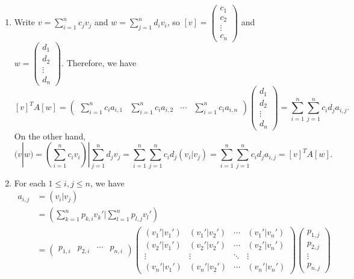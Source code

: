 \documentclass[a4paper, 12pt]{article}
\begin{document}
\begin{enumerate}[(1)]
\item Write \(v=\sum_{i=1}^{n}c_jv_j\) and \(w=\sum_{j=1}^{n}d_iv_i\), so \([v]=\begin{pmatrix}
	c_1\\ 
	c_2\\ 
	\vdots\\ 
	c_n
\end{pmatrix}\) and \(w=\begin{pmatrix}
	d_1\\
	d_2\\
	\vdots\\ 
	d_n
\end{pmatrix}\). Therefore, we have
\[[v]^T A [w]=\begin{pmatrix}
	\sum_{i=1}^{n} c_ia_{i,1} & \sum_{i=1}^{n}c_i a_{i,2} &\cdots& \sum_{i=1}^{n}c_ia_{i,n}
\end{pmatrix}\begin{pmatrix}
	d_1\\
	d_2\\
	\vdots\\
	d_n
\end{pmatrix}=\sum_{i=1}^{n}\sum_{j=1}^{n}c_id_ja_{i,j}.\]
On the other hand, 
\[(v|w)=(\sum_{i=1}^{n}c_iv_i)|\sum_{j=1}^{n}d_jv_j=\sum_{i=1}^{n}\sum_{j=1}^{n}c_id_j(v_i|v_j)=\sum_{i=1}^{n}\sum_{j=1}^{n}c_id_ja_{i,j}=[v]^T A[w].\]
\item For each \(1\leq i,j\leq n\), we have 
\begin{align*}
	a_{i,j} & =(v_i|v_j)\\ 
	        & =(\sum_{k=1}^{n}p_{k,i}v_k'|\sum_{l=1}^{n}p_{l,j}v_l')\\ 
			& =\begin{pmatrix}
				p_{1,i}&p_{2,i}&\cdots&p_{n,i}
			\end{pmatrix}\begin{pmatrix}
				(v_1'|v_1') & (v_1'|v_2') &\cdots & (v_1'|v_n')\\ 
				(v_2'|v_1') & (v_2'|v_2') &\cdots & (v_2'|v_n')\\ 
				\vdots &\vdots &\ddots & \vdots \\ 
				(v_n'|v_1') & (v_n'|v_2') &\cdots & (v_n'|v_n')
			\end{pmatrix}\begin{pmatrix}
				p_{1,j}\\ 
				p_{2,j}\\ 
				\vdots\\ 
				p_{n,j}
			\end{pmatrix}\\ 

\end{align*}
\end{enumerate}
\end{document}
